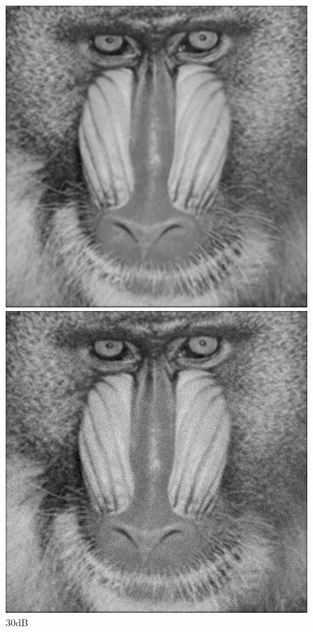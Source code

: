 \documentclass{article}
\begin{document}
\begin{figure}[H]
	\centering
	\begin{minipage}[b]{0.32\linewidth}
		\includegraphics[width=\linewidth,bb=0 0 20cm 20cm]{bn3.bmp}
		\caption*{30dB}
	\end{minipage}
	\begin{minipage}[b]{0.32\linewidth}
		\includegraphics[width=\linewidth,bb=0 0 20cm 20cm]{bn2.bmp}

\end{minipage}
\end{figure}
\end{document}
